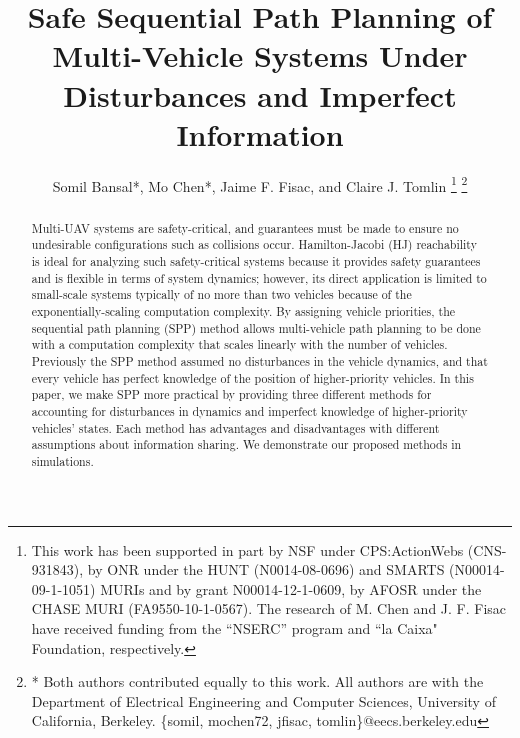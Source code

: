 \documentclass[letterpaper, 10 pt, conference]{ieeeconf}
\title{\LARGE \bf
Safe Sequential Path Planning of Multi-Vehicle Systems Under Disturbances and Imperfect Information}
\author{Somil Bansal*, Mo Chen*, Jaime F. Fisac, and Claire J. Tomlin
\thanks{This work has been supported in part by NSF under CPS:ActionWebs (CNS-931843), by ONR under the HUNT (N0014-08-0696) and SMARTS (N00014-09-1-1051) MURIs and by grant N00014-12-1-0609, by AFOSR under the CHASE MURI (FA9550-10-1-0567). The research of M. Chen and J. F. Fisac have received funding from the ``NSERC'' program and ``la Caixa" Foundation, respectively.}
\thanks{* Both authors contributed equally to this work. All authors are with the Department of Electrical Engineering and Computer Sciences, University of California, Berkeley. \{somil, mochen72, jfisac, tomlin\}@eecs.berkeley.edu}
}
\begin{document}
\maketitle
\thispagestyle{empty}
\pagestyle{empty}

\begin{abstract}
Multi-UAV systems are safety-critical, and guarantees must be made to ensure no undesirable configurations such as collisions occur. Hamilton-Jacobi (HJ) reachability is ideal for analyzing such safety-critical systems because it provides safety guarantees and is flexible in terms of system dynamics; however, its direct application is limited to small-scale systems typically of no more than two vehicles because of the exponentially-scaling computation complexity. By assigning vehicle priorities, the sequential path planning (SPP) method allows multi-vehicle path planning to be done with a computation complexity that scales linearly with the number of vehicles. Previously the SPP method assumed no disturbances in the vehicle dynamics, and that every vehicle has perfect knowledge of the position of higher-priority vehicles. In this paper, we make SPP more practical by providing three different methods for accounting for disturbances in dynamics and imperfect knowledge of higher-priority vehicles' states. Each method has advantages and disadvantages with different assumptions about information sharing. We demonstrate our proposed methods in simulations.
\end{abstract}

 \vspace{-0.5em} 











\end{document}
